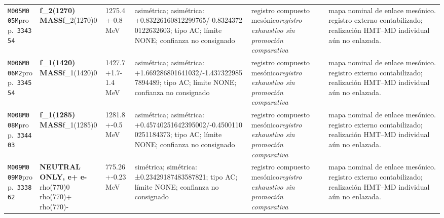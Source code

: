 \begin{landscape}
\begin{longtable}{L{1.85cm}L{4.45cm}L{2.35cm}L{4.05cm}L{3.35cm}L{7.15cm}}
\texttt{M005}\newline \texttt{M005M}\newline prop.\ \texttt{334354} & \textbf{f\_\allowbreak{}2(1270) MASS}\newline f\_\allowbreak{}2(1270)0 & 1275.4+-0.8\,MeV & asimétrica; asimétrica: +0.83226160812299765/-0.83243720122632603; tipo AC; límite NONE; confianza no consignado & registro compuesto mesónico\newline \emph{registro exhaustivo sin promoción comparativa} & mapa nominal de enlace mesónico. registro externo contabilizado; realización HMT--MD individual aún no enlazada. \\
\texttt{M006}\newline \texttt{M006M2}\newline prop.\ \texttt{334554} & \textbf{f\_\allowbreak{}1(1420) MASS}\newline f\_\allowbreak{}1(1420)0 & 1427.7+1.7-1.4\,MeV & asimétrica; asimétrica: +1.669286801641032/-1.4373229857894489; tipo AC; límite NONE; confianza no consignado & registro compuesto mesónico\newline \emph{registro exhaustivo sin promoción comparativa} & mapa nominal de enlace mesónico. registro externo contabilizado; realización HMT--MD individual aún no enlazada. \\
\texttt{M008}\newline \texttt{M008M}\newline prop.\ \texttt{334403} & \textbf{f\_\allowbreak{}1(1285) MASS}\newline f\_\allowbreak{}1(1285)0 & 1281.8+-0.5\,MeV & asimétrica; asimétrica: +0.45740251642395002/-0.45001100251184373; tipo AC; límite NONE; confianza no consignado & registro compuesto mesónico\newline \emph{registro exhaustivo sin promoción comparativa} & mapa nominal de enlace mesónico. registro externo contabilizado; realización HMT--MD individual aún no enlazada. \\
\texttt{M009}\newline \texttt{M009M0}\newline prop.\ \texttt{333862} & \textbf{NEUTRAL ONLY, e+ e-}\newline rho(770)0 \textbar{}\allowbreak{} rho(770)+ \textbar{}\allowbreak{} rho(770)- & 775.26+-0.23\,MeV & simétrica; simétrica: ±0.23429187483587821; tipo AC; límite NONE; confianza no consignado & registro compuesto mesónico\newline \emph{registro exhaustivo sin promoción comparativa} & mapa nominal de enlace mesónico. registro externo contabilizado; realización HMT--MD individual aún no enlazada. \\

\end{longtable}
\end{landscape}
